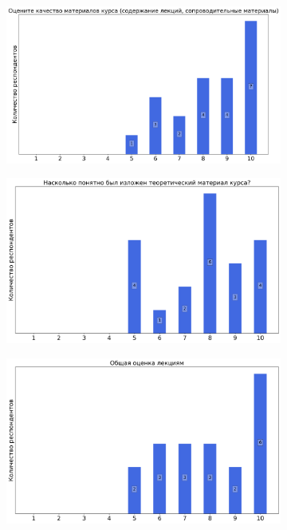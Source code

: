 \begin{figure}[H]
\begin{subfigure}[b]{0.45\textwidth}
			\end{subfigure}
			\begin{subfigure}[b]{0.45\textwidth}
				\centering
				\includegraphics[width=\textwidth]{images/2 course/Общая физика - электричество и магнетизм/lecturer-marks-Овчинкин В.А.-1.png}
			\end{subfigure}
			\begin{subfigure}[b]{0.45\textwidth}
				\centering
				\includegraphics[width=\textwidth]{images/2 course/Общая физика - электричество и магнетизм/lecturer-marks-Овчинкин В.А.-2.png}
			\end{subfigure}	
			\begin{subfigure}[b]{0.45\textwidth}
				\centering
				\includegraphics[width=\textwidth]{images/2 course/Общая физика - электричество и магнетизм/lecturer-marks-Овчинкин В.А.-3.png}

\end{subfigure}
\end{figure}
